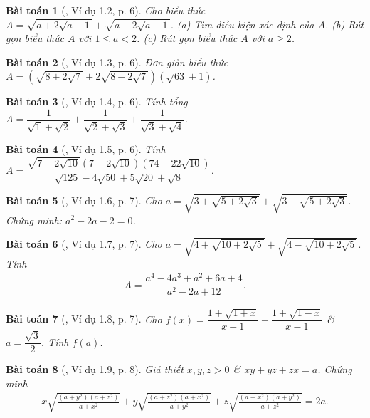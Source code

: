 \documentclass{article}
\newtheorem{baitoan}{Bài toán}
\begin{document}
\begin{baitoan}[\cite{TLCT_THCS_Toan_9_dai_so}, Ví dụ 1.2, p. 6]
	Cho biểu thức $A = \sqrt{a + 2\sqrt{a - 1}} + \sqrt{a - 2\sqrt{a - 1}}$. (a) Tìm điều kiện xác định của $A$. (b) Rút gọn biểu thức $A$ với $1\le a < 2$. (c) Rút gọn biểu thức $A$ với $a\ge2$.
\end{baitoan}

\begin{baitoan}[\cite{TLCT_THCS_Toan_9_dai_so}, Ví dụ 1.3, p. 6]
	Đơn giản biểu thức $A = \left(\sqrt{8 + 2\sqrt{7}} + 2\sqrt{8 - 2\sqrt{7}}\right)(\sqrt{63} + 1)$.
\end{baitoan}

\begin{baitoan}[\cite{TLCT_THCS_Toan_9_dai_so}, Ví dụ 1.4, p. 6]
	Tính tổng $A = \dfrac{1}{\sqrt{1} + \sqrt{2}} + \dfrac{1}{\sqrt{2} + \sqrt{3}} + \dfrac{1}{\sqrt{3} + \sqrt{4}}$.
\end{baitoan}

\begin{baitoan}[\cite{TLCT_THCS_Toan_9_dai_so}, Ví dụ 1.5, p. 6]
	Tính $A = \dfrac{\sqrt{7 - 2\sqrt{10}}(7 + 2\sqrt{10})(74 - 22\sqrt{10})}{\sqrt{125} - 4\sqrt{50} + 5\sqrt{20} + \sqrt{8}}$.
\end{baitoan}

\begin{baitoan}[\cite{TLCT_THCS_Toan_9_dai_so}, Ví dụ 1.6, p. 7]
	Cho $a = \sqrt{3 + \sqrt{5 + 2\sqrt{3}}} + \sqrt{3 - \sqrt{5 + 2\sqrt{3}}}$. Chứng minh: $a^2 - 2a - 2 = 0$.
\end{baitoan}

\begin{baitoan}[\cite{TLCT_THCS_Toan_9_dai_so}, Ví dụ 1.7, p. 7]
	Cho $a = \sqrt{4 + \sqrt{10 + 2\sqrt{5}}} + \sqrt{4 - \sqrt{10 + 2\sqrt{5}}}$. Tính
	\begin{align*}
		A = \dfrac{a^4 - 4a^3 + a^2 + 6a + 4}{a^2 - 2a + 12}.
	\end{align*}
\end{baitoan}

\begin{baitoan}[\cite{TLCT_THCS_Toan_9_dai_so}, Ví dụ 1.8, p. 7]
	Cho $f(x) = \dfrac{1 + \sqrt{1 + x}}{x + 1} + \dfrac{1 + \sqrt{1 - x}}{x - 1}$ \& $a = \dfrac{\sqrt{3}}{2}$. Tính $f(a)$.
\end{baitoan}

\begin{baitoan}[\cite{TLCT_THCS_Toan_9_dai_so}, Ví dụ 1.9, p. 8]
	Giả thiết $x,y,z > 0$ \& $xy + yz + zx = a$. Chứng minh
	\begin{align*}
		x\sqrt{\frac{(a + y^2)(a + z^2)}{a + x^2}} + y\sqrt{\frac{(a + z^2)(a + x^2)}{a + y^2}} + z\sqrt{\frac{(a + x^2)(a + y^2)}{a + z^2}} = 2a.
	\end{align*}
\end{baitoan}
\end{document}
